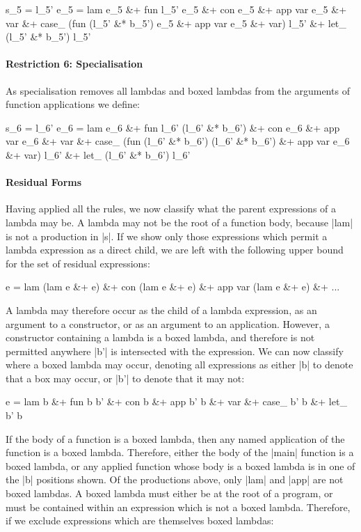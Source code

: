 \ignore\begin{code}
s_5   =  l_5'
e_5   =  lam e_5 &+ fun l_5' e_5 &+ con e_5 &+ app var e_5 &+ var &+
         case_ (fun (l_5' &* b_5') e_5 &+ app var e_5 &+ var) l_5' &+
         let_ (l_5' &* b_5') l_5'
\end{code}

\paragraph{Restriction 6: Specialisation}
As specialisation removes all lambdas and boxed lambdas from the arguments of function applications we define:

\ignore\begin{code}
s_6  =  l_6'
e_6  =  lam e_6 &+ fun l_6' (l_6' &* b_6') &+ con e_6 &+ app var e_6 &+ var &+
        case_ (fun (l_6' &* b_6') (l_6' &* b_6') &+ app var e_6 &+ var) l_6' &+
        let_ (l_6' &* b_6') l_6'
\end{code}

\paragraph{Residual Forms}
Having applied all the rules, we now classify what the parent expressions of a lambda may be. A lambda may not be the root of a function body, because |lam| is not a production in |s|. If we show only those expressions which permit a lambda expression as a direct child, we are left with the following upper bound for the set of residual expressions:

\ignore\begin{code}
e =  lam (lam e &+ e) &+ con (lam e &+ e) &+
     app var (lam e &+ e) &+ ...
\end{code}

A lambda may therefore occur as the child of a lambda expression, as an argument to a constructor, or as an argument to an application. However, a constructor containing a lambda is a boxed lambda, and therefore is not permitted anywhere |b'| is intersected with the expression. We can now classify where a boxed lambda may occur, denoting all expressions as either |b| to denote that a box may occur, or |b'| to denote that it may not:

\ignore\begin{code}
e =  lam b &+ fun b b' &+ con b &+ app b' b &+
     var &+ case_ b' b &+ let_ b' b
\end{code}

If the body of a function is a boxed lambda, then any named application of the function is a boxed lambda. Therefore, either the body of the |main| function is a boxed lambda, or any applied function whose body is a boxed lambda is in one of the |b| positions shown. Of the productions above, only |lam| and |app| are not boxed lambdas. A boxed lambda must either be at the root of a program, or must be contained within an expression which is not a boxed lambda. Therefore, if we exclude expressions which are themselves boxed lambdas:

